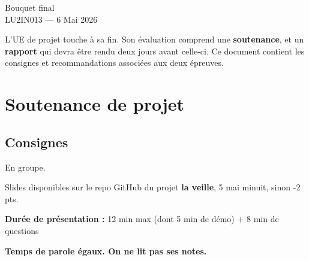 \documentclass[a4paper,12pt]{article}
\begin{document}
\begin{center}
    \LARGE{Bouquet final} \\
    \large{LU2IN013 --- 6 Mai 2026}
\end{center}

L'UE de projet touche à sa fin. 
Son évaluation comprend une \textbf{soutenance}, et un \textbf{rapport} 
qui devra être rendu deux jours avant celle-ci.
Ce document contient les consignes et recommandations associées aux deux épreuves.

\section{Soutenance de projet}

\subsection{Consignes}

En groupe.

\vspace{0.2cm}

Slides disponibles sur le repo GitHub du projet \textbf{la veille}, 5 mai minuit, sinon -2 pts.

\vspace{0.2cm}

\textbf{Durée de présentation :} 12 min max (dont 5 min de démo) + 8 min de questions

\vspace{0.2cm}

\textbf{Temps de parole égaux. On ne lit pas ses notes.}

\vspace{0.2cm}
\end{document}
